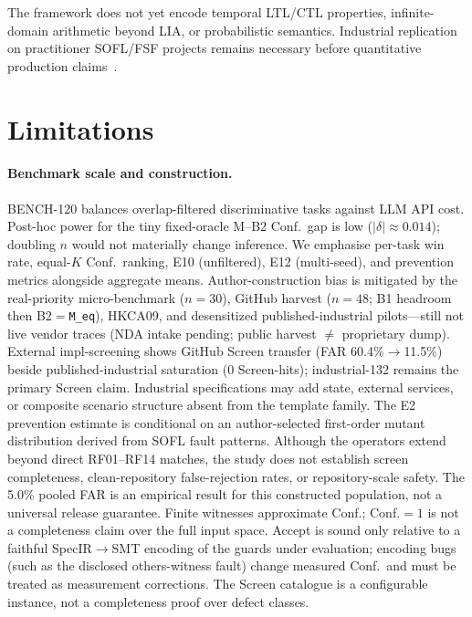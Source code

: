 The framework does not yet encode temporal LTL/CTL properties, infinite-domain
arithmetic beyond LIA, or probabilistic semantics.
Industrial replication on practitioner SOFL/FSF projects remains necessary
before quantitative production claims~\citep{li2022qrs_companion,pohl2010requirements}.


\section{Limitations}
\label{sec:disc:limitations}

\paragraph{Benchmark scale and construction.}
BENCH-120 balances overlap-filtered discriminative tasks against LLM API cost.
Post-hoc power for the tiny fixed-oracle M--B2 Conf.\ gap is low
($|\delta|{\approx}0.014$); doubling $n$ would not materially change
inference.
We emphasise per-task win rate, equal-$K$ Conf.\ ranking, E10
(unfiltered), E12 (multi-seed), and prevention metrics alongside aggregate
means.
Author-construction bias is mitigated by the real-priority micro-benchmark
($n{=}30$), GitHub harvest ($n{=}48$; B1 headroom then B2${=}$\texttt{M\_eq}),
HKCA09, and desensitized published-industrial pilots---still not live vendor
traces (NDA intake pending; public harvest $\neq$ proprietary dump).
External impl-screening shows GitHub Screen transfer
(FAR 60.4\%$\rightarrow$11.5\%) beside published-industrial saturation
(0 Screen-hits); industrial-132 remains the primary Screen claim.
Industrial specifications may add state, external services, or composite
scenario structure absent from the template family.
The E2 prevention estimate is conditional on an author-selected first-order
mutant distribution derived from SOFL fault patterns.  Although the operators
extend beyond direct RF01--RF14 matches, the study does not establish screen
completeness, clean-repository false-rejection rates, or repository-scale
safety.  The 5.0\% pooled FAR is an empirical result for this constructed
population, not a universal release guarantee.
Finite witnesses approximate Conf.; Conf.${=}1$ is not a completeness claim
over the full input space.
Accept is sound only relative to a faithful SpecIR$\to$SMT encoding of the
guards under evaluation; encoding bugs (such as the disclosed others-witness
fault) change measured Conf.\ and must be treated as measurement corrections.
The Screen catalogue is a configurable instance, not a completeness proof over
defect classes.

